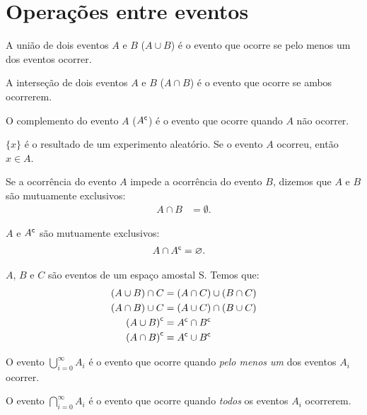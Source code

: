 \section{Operações entre eventos}

\begin{definition}
    A união de dois eventos $A$ e $B$ ($A \cup B$) é o evento
    que ocorre se pelo menos um dos eventos ocorrer.
\end{definition}

\begin{definition}
    A interseção de dois eventos $A$ e $B$ ($A \cap B$) é o evento
    que ocorre se ambos ocorrerem.
\end{definition}

\begin{definition}
    O complemento do evento $A$ (${A}^{\mathsf{c}}$) é o evento que ocorre
    quando $A$ não ocorrer.
\end{definition}

\begin{obs}
    $\{x\}$ é o resultado de um experimento aleatório.
    Se o evento $A$ ocorreu, então $x \in A$.
\end{obs}

Se a ocorrência do evento $A$ impede a ocorrência do evento $B$,
dizemos que $A$ e $B$ são mutuamente exclusivos:
\begin{align*}
    A \cap B &= \emptyset.
\end{align*}

\begin{example}
    $A$ e ${A}^{\mathsf{c}}$ são mutuamente exclusivos:
    \begin{align*}
        A \cap {A}^{\mathsf{c}} &= \varnothing.
    \end{align*}
\end{example}

\begin{lemma}\label{eq:ch01-ops}
    $A$, $B$ e $C$ são eventos de um espaço amostal S. Temos que:
    \begin{align}
        (A \cup B) \cap C &= (A \cap C) \cup (B \cap C) 
            \label{eq:ch01-ops-1} \\
        (A \cap B) \cup C &= (A \cup C) \cap (B \cup C) 
            \label{eq:ch01-ops-2} \\
        {(A \cup B)}^{\mathsf{c}} &= {A}^{\mathsf{c}} \cap {B}^{\mathsf{c}}
            \label{eq:ch01-ops-3} \\
        {(A \cap B)}^{\mathsf{c}} &= {A}^{\mathsf{c}} \cup {B}^{\mathsf{c}}
            \label{eq:ch01-ops-4}
    \end{align}
\end{lemma}

\begin{definition}
    O evento $\bigcup_{i = 0}^\infty A_i$ é o evento que ocorre
    quando \textit{pelo menos um} dos eventos $A_i$ ocorrer.
\end{definition}

\begin{definition}
    O evento $\bigcap_{i = 0}^\infty A_i$ é o evento que ocorre
    quando \textit{todos} os eventos $A_i$ ocorrerem.
\end{definition}
